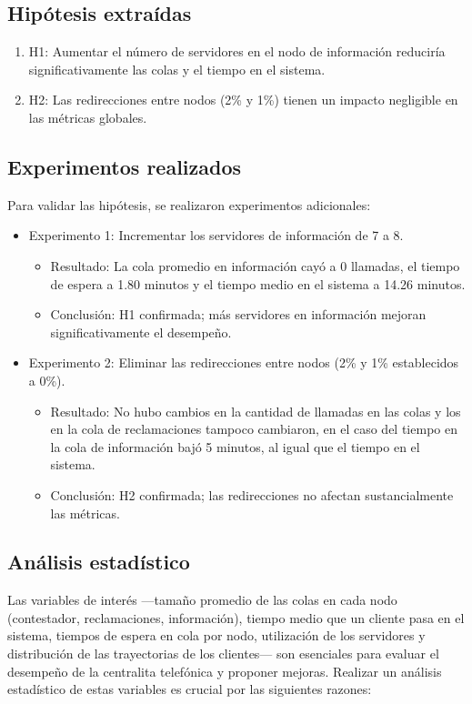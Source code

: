 \documentclass[12pt]{article}
\begin{document}
\subsection{Hipótesis extraídas}
\begin{enumerate}
    \item H1: Aumentar el número de servidores en el nodo de información reduciría significativamente las colas y el tiempo en el sistema.
    \item H2: Las redirecciones entre nodos (2\% y 1\%) tienen un impacto negligible en las métricas globales.
\end{enumerate}

\subsection{Experimentos realizados}
Para validar las hipótesis, se realizaron experimentos adicionales:
\begin{itemize}
    \item Experimento 1: Incrementar los servidores de información de 7 a 8.
    \begin{itemize}
        \item Resultado: La cola promedio en información cayó a 0 llamadas, el tiempo de espera a 1.80 minutos y el tiempo medio en el sistema a 14.26 minutos.
        \item Conclusión: H1 confirmada; más servidores en información mejoran significativamente el desempeño.
    \end{itemize}
    \item Experimento 2: Eliminar las redirecciones entre nodos (2\% y 1\% establecidos a 0\%).
    \begin{itemize}
        \item Resultado: No hubo cambios en la cantidad de llamadas en las colas y los en la cola de reclamaciones tampoco cambiaron, en el caso del tiempo en la cola de información bajó 5 minutos, al igual que el tiempo en el sistema.
        \item Conclusión: H2 confirmada; las redirecciones no afectan sustancialmente las métricas.
    \end{itemize}
\end{itemize}

\subsection{Análisis estadístico}
Las variables de interés ---tamaño promedio de las colas en cada nodo (contestador, reclamaciones, información), tiempo medio que un cliente pasa en el sistema, tiempos de espera en cola por nodo, utilización de los servidores y distribución de las trayectorias de los clientes--- son esenciales para evaluar el desempeño de la centralita telefónica y proponer mejoras. Realizar un análisis estadístico de estas variables es crucial por las siguientes razones:
\end{document}
